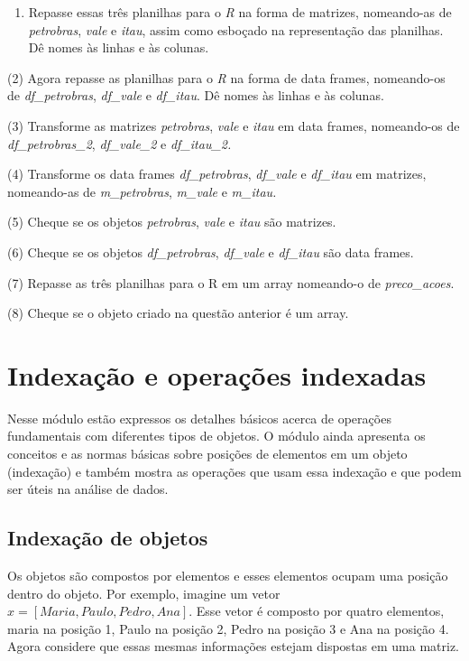 \documentclass[
  letterpaper,
  DIV=11,
  numbers=noendperiod]{scrreprt}
\providecommand{\tightlist}{%
  \setlength{\itemsep}{0pt}\setlength{\parskip}{0pt}}\usepackage{longtable,booktabs,array}
\begin{document}
\begin{enumerate}
\def\labelenumi{(\arabic{enumi})}
\tightlist
\item
  Repasse essas três planilhas para o \emph{R} na forma de matrizes,
  nomeando-as de \emph{petrobras}, \emph{vale} e \emph{itau}, assim como
  esboçado na representação das planilhas. Dê nomes às linhas e às
  colunas.
\end{enumerate}

(2) Agora repasse as planilhas para o \emph{R} na forma de data frames,
nomeando-os de \emph{df\_petrobras}, \emph{df\_vale} e \emph{df\_itau}.
Dê nomes às linhas e às colunas.

(3) Transforme as matrizes \emph{petrobras}, \emph{vale} e \emph{itau}
em data frames, nomeando-os de \emph{df\_petrobras\_2},
\emph{df\_vale\_2} e \emph{df\_itau\_2.}

(4) Transforme os data frames \emph{df\_petrobras}, \emph{df\_vale} e
\emph{df\_itau} em matrizes, nomeando-as de \emph{m\_petrobras},
\emph{m\_vale} e \emph{m\_itau.}

(5) Cheque se os objetos \emph{petrobras}, \emph{vale} e \emph{itau} são
matrizes.

(6) Cheque se os objetos \emph{df\_petrobras}, \emph{df\_vale} e
\emph{df\_itau} são data frames.

(7) Repasse as três planilhas para o R em um array nomeando-o de
\emph{preco\_acoes}.

(8) Cheque se o objeto criado na questão anterior é um array.


\chapter{Indexação e operações
indexadas}\label{indexauxe7uxe3o-e-operauxe7uxf5es-indexadas}

Nesse módulo estão expressos os detalhes básicos acerca de operações
fundamentais com diferentes tipos de objetos. O módulo ainda apresenta
os conceitos e as normas básicas sobre posições de elementos em um
objeto (indexação) e também mostra as operações que usam essa indexação
e que podem ser úteis na análise de dados.

\section{Indexação de objetos}\label{indexauxe7uxe3o-de-objetos}

Os objetos são compostos por elementos e esses elementos ocupam uma
posição dentro do objeto. Por exemplo, imagine um vetor
\(x = [Maria, Paulo, Pedro, Ana]\). Esse vetor é composto por quatro
elementos, maria na posição 1, Paulo na posição 2, Pedro na posição 3 e
Ana na posição 4. Agora considere que essas mesmas informações estejam
dispostas em uma matriz.
\end{document}
